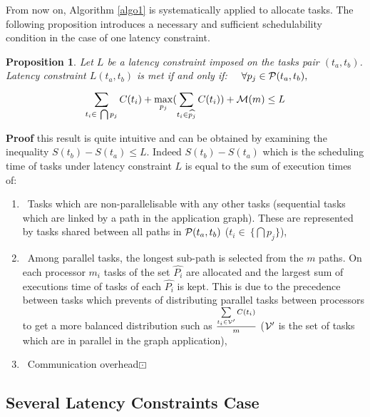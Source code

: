 \documentclass{ijcaArticle}
\newtheorem{Proposition}{Proposition}
\begin{document}
From now on, Algorithm \ref{algo1} is systematically applied to allocate tasks. 
The following proposition introduces a necessary and sufficient schedulability condition in the case of one latency constraint.
\vskip2mm
\begin{Proposition}\label{clus_sim_n_cond_2} 
 Let $L$ be a latency constraint imposed on the tasks pair $(t_{a},t_{b})$. Latency constraint $L(t_{a}, t_{b})$  is met if and only if:  \ \ $\forall p_j \in {\cal P}(t_a,t_b), $
\begin{equation}\label{eq_clus_sim_cond_multi_2} \sum\limits_{t_i \in \ \bigcap p_j }^{} C(t_i) +  \max\limits_{{p_j}}(\sum\limits_{t_i \in \widehat{p_j}}^{} C(t_i)) + { \cal M}(m)  \leq L 
\end{equation} 
\end{Proposition}
\vskip2mm
\textbf{Proof} 
this result is quite intuitive and can be obtained by examining the inequality $ S(t_b) - S(t_a) \leq L$. Indeed $ S(t_b) - S(t_a)$ which is the scheduling time of tasks under latency constraint $L$ is equal to the sum of execution times of:
\begin{enumerate}
\item \ Tasks which are  non-parallelisable with any other tasks (sequential tasks which are linked by a path in the application graph). These are represented by tasks shared between all paths in ${\cal P}(t_a,t_b)$ ($t_i \in \ \{\bigcap p_j\} $), 
\item \ Among parallel tasks, the longest sub-path is selected from the $m$ paths. On each processor $m_i$ tasks of the set $\widehat{P_i}$  are allocated and the
largest sum of executions time of tasks of each  $\widehat{P_i}$ is kept. This is due to the precedence between tasks which prevents of distributing parallel tasks between processors to get a more balanced distribution such as $\frac{\sum\limits_{t_i \in {\cal V}\rq{}} C(t_i)}{m}$ (${\cal V}\rq{}$ is the set of tasks which are in parallel in the graph application), 
\item \ Communication overhead$\boxdot$ 
\end{enumerate} 
        







\subsection{Several Latency Constraints Case}
\end{document}
